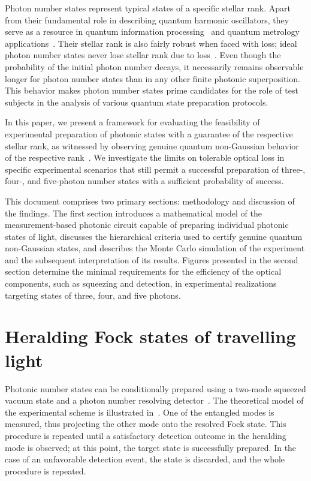 \documentclass{article}
\begin{document}
Photon number states represent typical states of a specific stellar rank. Apart from their fundamental role in describing quantum harmonic oscillators, they serve as a resource in quantum information processing~\cite{marek2009} and quantum metrology applications~\cite{kunitski2019,oh2020}. Their stellar rank is also fairly robust when faced with loss; ideal photon number states never lose stellar rank due to loss~\cite{lachman2019}. Even though the probability of the initial photon number decays, it necessarily remains observable longer for photon number states than in any other finite photonic superposition. This behavior makes photon number states prime candidates for the role of test subjects in the analysis of various quantum state preparation protocols.

In this paper, we present a framework for evaluating the feasibility of experimental preparation of photonic states with a guarantee of the respective stellar rank, as witnessed by observing genuine quantum non-Gaussian behavior of the respective rank~\cite{lachman2019}. We investigate the limits on tolerable optical loss in specific experimental scenarios that still permit a successful preparation of three-, four-, and five-photon number states with a sufficient probability of success.
 
This document comprises two primary sections:  methodology and discussion of the findings. The first section introduces a mathematical model of the measurement-based photonic circuit capable of preparing individual photonic states of light, discusses the hierarchical criteria used to certify genuine quantum non-Gaussian states, and describes the Monte Carlo simulation of the experiment and the subsequent interpretation of its results. Figures presented in the second section determine the minimal requirements for the efficiency of the optical components, such as squeezing and detection, in experimental realizations targeting states of three, four, and five photons.

%

\section{Heralding Fock states of travelling light}

Photonic number states can be conditionally prepared using a two-mode squeezed vacuum state and a photon number resolving detector~\cite{yukawa2013a,yoshikawa2018,tiedau2019,provaznik2020}. The theoretical model of the experimental scheme is illustrated in~. One of the entangled modes is measured, thus projecting the other mode onto the resolved Fock state. This procedure is repeated until a satisfactory detection outcome in the heralding mode is observed; at this point, the target state is successfully prepared. In the case of an unfavorable detection event, the state is discarded, and the whole procedure is repeated.
\end{document}
